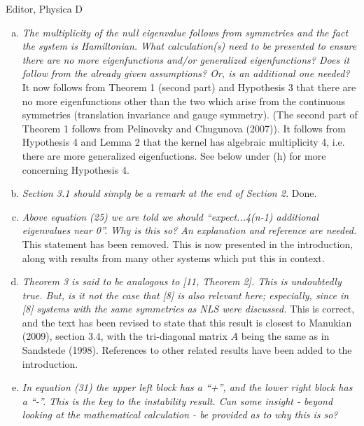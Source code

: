 \documentclass[11pt]{letter}
\begin{document}
\begin{letter}{Editor, Physica D}
\begin{enumerate}[(a)]
\item \emph{The multiplicity of the null eigenvalue follows from symmetries and the fact the system is Hamiltonian. What calculation(s) need to be presented to ensure there are no more eigenfunctions and/or generalized eigenfunctions? Does it follow from the already given assumptions? Or, is an additional one needed?} It now follows from Theorem 1 (second part) and Hypothesis 3 that there are no more eigenfunctions other than the two which arise from the continuous symmetries (translation invariance and gauge symmetry). (The second part of Theorem 1 follows from Pelinovsky and Chugunova (2007)). It follows from Hypothesis 4 and Lemma 2 that the kernel has algebraic multiplicity 4, i.e. there are more generalized eigenfuctions. See below under (h) for more concerning Hypothesis 4.
\vspace{4mm}

\item \emph{Section 3.1 should simply be a remark at the end of Section 2.} Done.
\vspace{4mm}

\item \emph{Above equation (25) we are told we should ``expect...4(n-1) additional eigenvalues  near 0''. Why is this so? An explanation and reference are needed.} This statement has been removed. This is now presented in the introduction, along with results from many other systems which put this in context.
\vspace{4mm}

\item \emph{Theorem 3 is said to be analogous to [11, Theorem 2]. This is undoubtedly true. But, is it not the case that [8] is also relevant here; especially, since in [8] systems with the same symmetries as NLS were discussed.} This is correct, and the text has been revised to state that this result is closest to Manukian (2009), section 3.4, with the tri-diagonal matrix $A$ being the same as in Sandstede (1998). References to other related results have been added to the introduction.
\vspace{4mm}

\item \emph{In equation (31) the upper left block has a ``+'', and the lower right block has a ``-''. This is the key to the instability result. Can some insight - beyond looking at the mathematical calculation - be provided as to why this is so?}
\vspace{4mm}


\end{enumerate}
\end{letter}
\end{document}
